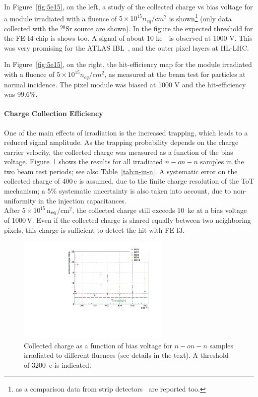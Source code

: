 In Figure~\ref{fig:5e15}, on the left, a study of the collected charge vs bias voltage
 for a module irradiated with a fluence of $5\times 10^{15} n_{eq}/cm^{2}$ is shown\footnote{as
 a comparison data from strip detectors~\cite{Casse} are reported too.} (only data collected with the
 $^{90}$Sr  source are shown).  In the figure the expected threshold for the FE-I4
 chip is shows too. A signal of about 10 ke$^-$ is observed at 1000 V. This was very
 promising for the  ATLAS IBL~\cite{IBLTDR}, and
  the outer pixel layers at HL-LHC.

In Figure~\ref{fig:5e15}, on the right, the hit-efficiency map for the module irradiated with a
fluence of $5\times 10^{15} n_{eq}/cm^{2}$, as measured at the beam test for particles
at normal incidence. The pixel module was biased at 1000 V and the hit-efficiency was 99.6\%.


\paragraph{Charge Collection Efficiency}
One of the main effects of irradiation is the increased trapping, which leads to a reduced signal amplitude. 
As the trapping probability depends on the charge carrier velocity, the collected charge was measured as a 
function of the bias voltage. Figure~\ref{fig:DO_all_Save} shows the results for all irradiated $n-on-n$ 
samples in the two beam test periods; see also Table~\ref{tab:n-in-n}. A systematic error on the collected 
charge of 400\,e is assumed, due to the finite charge resolution of the ToT mechanism;  a 5\% systematic 
uncertainty is also taken into account, due to non-uniformity in the injection capacitances.\\
After $5\times 10^{15}$\,n$_{\rm eq}$/cm$^2$, the collected charge still exceeds 10~ke at a bias voltage of 
1000\,V. Even if the collected charge is shared equally between two neighboring pixels, this charge is 
sufficient to detect the hit with FE-I3.

\begin{figure}[!htpb]
 \begin{center}
  \includegraphics[width=0.65\textwidth]{DO_all_Save.pdf}
 \end{center}
 \caption{\label{fig:DO_all_Save}Collected charge as a function of bias voltage for $n-on-n$ samples irradiated to different fluences
 (see details in the text).
 A threshold of 3200~e is indicated.}
\end{figure}

